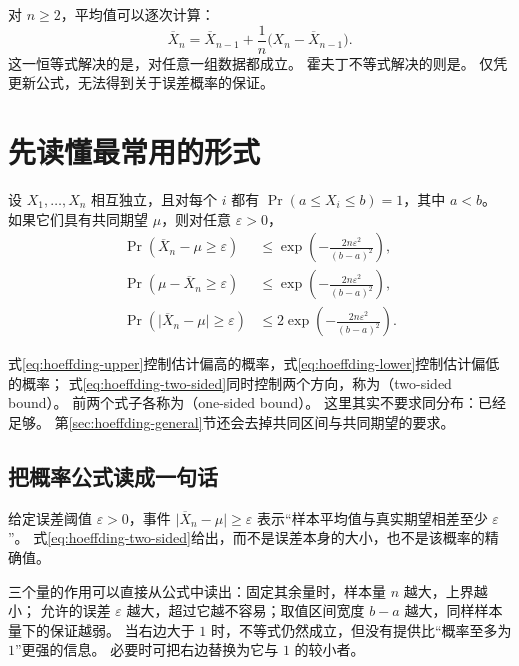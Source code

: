 \documentclass[UTF8]{ctexart}
\begin{document}
对 $n\geq2$，平均值可以逐次计算：
\[
  \overline X_n=\overline X_{n-1}
  +\frac1n\bigl(X_n-\overline X_{n-1}\bigr).
\]
这一恒等式解决的是，对任意一组数据都成立。
霍夫丁不等式解决的则是。
仅凭更新公式，无法得到关于误差概率的保证。

\section{先读懂最常用的形式}
\label{sec:hoeffding-common-form}

\begin{theorem}[共同有界区间下的霍夫丁不等式]
\label{thm:hoeffding-common}
设 $X_1,\ldots,X_n$ 相互独立，且对每个 $i$ 都有 $\Pr(a\leq X_i\leq b)=1$，其中 $a<b$。
如果它们具有共同期望 $\mu$，则对任意 $\varepsilon>0$，
\begin{align}
  \Pr(\overline X_n-\mu\geq\varepsilon)
  &\leq \exp\!\left(-\frac{2n\varepsilon^2}{(b-a)^2}\right),
  \label{eq:hoeffding-upper}\\
  \Pr(\mu-\overline X_n\geq\varepsilon)
  &\leq \exp\!\left(-\frac{2n\varepsilon^2}{(b-a)^2}\right),
  \label{eq:hoeffding-lower}\\
  \Pr\!\left(\lvert\overline X_n-\mu\rvert\geq\varepsilon\right)
  &\leq 2\exp\!\left(-\frac{2n\varepsilon^2}{(b-a)^2}\right).
  \label{eq:hoeffding-two-sided}
\end{align}
\end{theorem}

式\eqref{eq:hoeffding-upper}控制估计偏高的概率，式\eqref{eq:hoeffding-lower}控制估计偏低的概率；
式\eqref{eq:hoeffding-two-sided}同时控制两个方向，称为（two-sided bound）。
前两个式子各称为（one-sided bound）。
这里其实不要求同分布：已经足够。
第\ref{sec:hoeffding-general}节还会去掉共同区间与共同期望的要求。

\subsection{把概率公式读成一句话}

给定误差阈值 $\varepsilon>0$，事件
$\lvert\overline X_n-\mu\rvert\geq\varepsilon$
表示“样本平均值与真实期望相差至少 $\varepsilon$”。
式\eqref{eq:hoeffding-two-sided}给出，而不是误差本身的大小，也不是该概率的精确值。

三个量的作用可以直接从公式中读出：固定其余量时，样本量 $n$ 越大，上界越小；
允许的误差 $\varepsilon$ 越大，超过它越不容易；取值区间宽度 $b-a$ 越大，同样样本量下的保证越弱。
当右边大于 $1$ 时，不等式仍然成立，但没有提供比“概率至多为 $1$”更强的信息。
必要时可把右边替换为它与 $1$ 的较小者。
\end{document}
